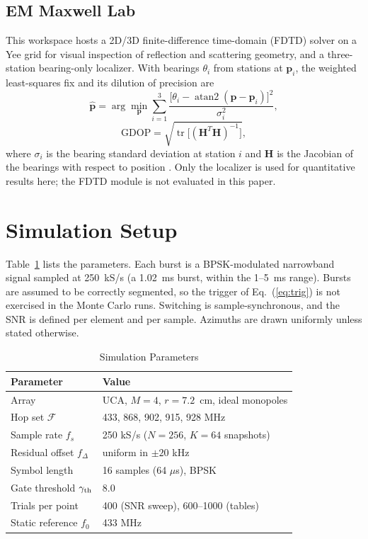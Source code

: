 \documentclass[conference]{IEEEtran}
\newcommand{\vect}[1]{\mathbf{#1}}
\begin{document}
\subsection{EM Maxwell Lab}
This workspace hosts a 2D/3D finite-difference time-domain (FDTD) solver on a Yee grid \cite{yee} for visual inspection of reflection and scattering geometry, and a three-station bearing-only localizer. With bearings $\theta_i$ from stations at $\vect{p}_i$, the weighted least-squares fix and its dilution of precision are
\begin{equation}
\boxed{\hat{\vect p}=\arg\min_{\vect p}\sum_{i=1}^{3}\frac{\big[\theta_i-\operatorname{atan2}(\vect p-\vect p_i)\big]^2}{\sigma_i^2}},
\label{eq:wls}
\end{equation}
\begin{equation}
\boxed{\mathrm{GDOP}=\sqrt{\operatorname{tr}\big[(\vect H^{T}\vect H)^{-1}\big]}},
\label{eq:gdop}
\end{equation}
where $\sigma_i$ is the bearing standard deviation at station $i$ and $\vect H$ is the Jacobian of the bearings with respect to position \cite{torrieri}. Only the localizer is used for quantitative results here; the FDTD module is not evaluated in this paper.

\section{Simulation Setup}\label{sec:setup}
Table~\ref{tab:params} lists the parameters. Each burst is a BPSK-modulated narrowband signal sampled at 250~kS/s (a 1.02~ms burst, within the 1--5~ms range). Bursts are assumed to be correctly segmented, so the trigger of Eq.~(\ref{eq:trig}) is not exercised in the Monte Carlo runs. Switching is sample-synchronous, and the SNR is defined per element and per sample. Azimuths are drawn uniformly unless stated otherwise.

\begin{table}[!t]
\caption{Simulation Parameters}
\label{tab:params}
\centering
\small
\begin{tabular}{@{}ll@{}}
\toprule
Parameter & Value \\
\midrule
Array & UCA, $M=4$, $r=7.2$~cm, ideal monopoles \\
Hop set $\mathcal F$ & 433, 868, 902, 915, 928 MHz \\
Sample rate $f_s$ & 250 kS/s ($N=256$, $K=64$ snapshots) \\
Residual offset $f_\Delta$ & uniform in $\pm20$ kHz \\
Symbol length & 16 samples (64 $\mu$s), BPSK \\
Gate threshold $\gamma_{\rm th}$ & 8.0 \\
Trials per point & 400 (SNR sweep), 600--1000 (tables) \\
Static reference $f_0$ & 433 MHz \\
\bottomrule
\end{tabular}
\end{table}
\end{document}
